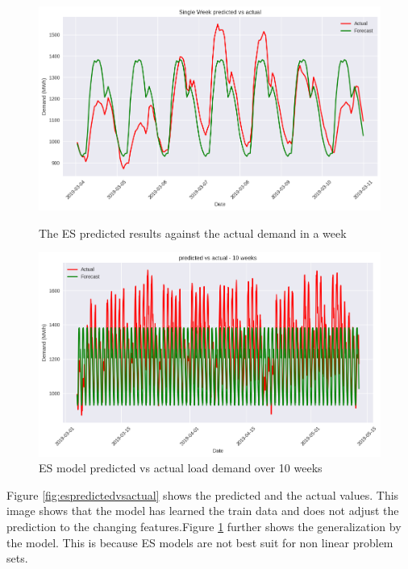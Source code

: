 \begin{figure}[h]
	\begin{minipage}[b]{0.45\linewidth}
	\centering
	\includegraphics[width=\linewidth]{Chapters/images/results/ES_predicted_vs_actual}
	\caption{The ES predicted results against the actual demand in a week}
	\label{fig:espredictedvsactual}
\end{minipage}
\hfill
\begin{minipage}[b]{0.45\linewidth}
	\centering
	\includegraphics[width=\linewidth]{Chapters/images/results/ES_predicted_vs_actual_10weeks}
	\caption{ES model predicted vs actual load demand over 10 weeks}
	\label{fig:espredictedvsactual10weeks}
	
\end{minipage}
\end{figure}
 Figure \ref{fig:espredictedvsactual} shows the predicted and the actual values. This image shows that the model has learned the train data and does not adjust the prediction to the changing features.Figure \ref{fig:espredictedvsactual10weeks} further shows the generalization by the model. This is because ES models are not best suit for non linear problem sets.

